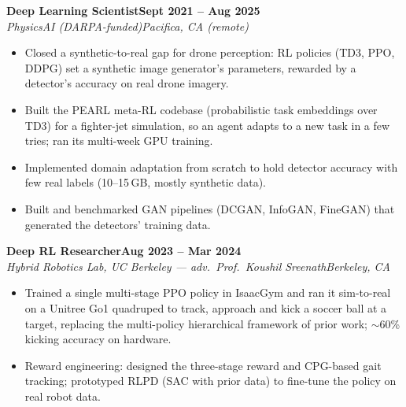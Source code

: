 \documentclass[10pt]{article}
\newcommand{\role}[4]{\textbf{#1}\hfill\textbf{#2}\\\textit{#3}\hfill\textit{#4}}
\begin{document}
\role{Deep Learning Scientist}{Sept 2021 -- Aug 2025}{PhysicsAI (DARPA-funded)}{Pacifica, CA (remote)}
\begin{itemize}
\item Closed a synthetic-to-real gap for drone perception: RL policies (TD3, PPO, DDPG) set a synthetic image generator's parameters, rewarded by a detector's accuracy on real drone imagery.
\item Built the PEARL meta-RL codebase (probabilistic task embeddings over TD3) for a fighter-jet simulation, so an agent adapts to a new task in a few tries; ran its multi-week GPU training.
\item Implemented domain adaptation from scratch to hold detector accuracy with few real labels (10--15\,GB, mostly synthetic data).
\item Built and benchmarked GAN pipelines (DCGAN, InfoGAN, FineGAN) that generated the detectors' training data.
\end{itemize}

\role{Deep RL Researcher}{Aug 2023 -- Mar 2024}{Hybrid Robotics Lab, UC Berkeley --- adv.\ Prof.\ Koushil Sreenath}{Berkeley, CA}
\begin{itemize}
\item Trained a single multi-stage PPO policy in IsaacGym and ran it sim-to-real on a Unitree Go1 quadruped to track, approach and kick a soccer ball at a target, replacing the multi-policy hierarchical framework of prior work; $\sim$60\% kicking accuracy on hardware.
\item Reward engineering: designed the three-stage reward and CPG-based gait tracking; prototyped RLPD (SAC with prior data) to fine-tune the policy on real robot data.
\end{itemize}



\end{document}
